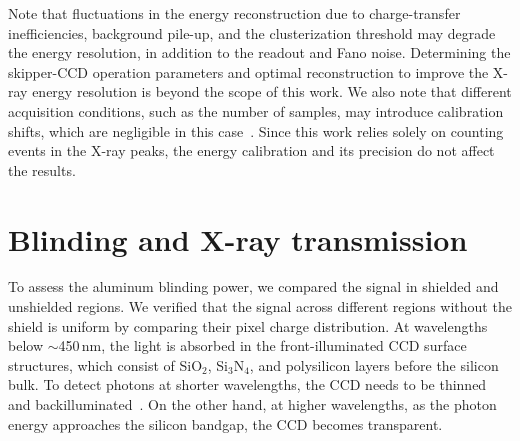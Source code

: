 \documentclass[twocolumn]{aastex631}
\begin{document}
Note that fluctuations in the energy reconstruction due to charge-transfer inefficiencies, background pile-up, and the clusterization threshold may degrade the energy resolution, in addition to the readout and Fano noise. Determining the skipper-CCD operation parameters and optimal reconstruction to improve the X-ray energy resolution is beyond the scope of this work. We also note that different acquisition conditions, such as the number of samples, may introduce calibration shifts, which are negligible in this case~\cite{Drlica_2020}. Since this work relies solely on counting events in the X-ray peaks, the energy calibration and its precision do not affect the results.



\section{Blinding and X-ray transmission} \label{sec:results}




To assess the aluminum blinding power, we compared the signal in shielded and unshielded regions. We verified that the signal across different regions without the shield is uniform by comparing their pixel charge distribution. At wavelengths below $\sim$450\,nm, the light is absorbed in the front-illuminated CCD surface structures, which consist of SiO$_2$, Si$_3$N$_4$, and polysilicon layers before the silicon bulk. To detect photons at shorter wavelengths, the CCD needs to be thinned and backilluminated~\cite{Groom1999,Holland:2003}. On the other hand, at higher wavelengths, as the photon energy approaches the silicon bandgap, the CCD becomes transparent.
\end{document}
